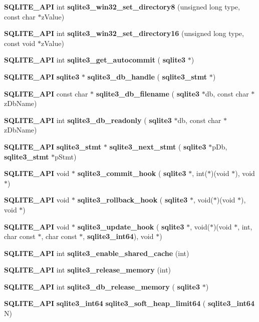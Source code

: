 \begin{DoxyCompactItemize}
\item 
\textbf{ S\+Q\+L\+I\+T\+E\+\_\+\+A\+PI} int \textbf{ sqlite3\+\_\+win32\+\_\+set\+\_\+directory8} (unsigned long type, const char $\ast$z\+Value)
\item 
\textbf{ S\+Q\+L\+I\+T\+E\+\_\+\+A\+PI} int \textbf{ sqlite3\+\_\+win32\+\_\+set\+\_\+directory16} (unsigned long type, const void $\ast$z\+Value)
\item 
\textbf{ S\+Q\+L\+I\+T\+E\+\_\+\+A\+PI} int \textbf{ sqlite3\+\_\+get\+\_\+autocommit} (\textbf{ sqlite3} $\ast$)
\item 
\textbf{ S\+Q\+L\+I\+T\+E\+\_\+\+A\+PI} \textbf{ sqlite3} $\ast$ \textbf{ sqlite3\+\_\+db\+\_\+handle} (\textbf{ sqlite3\+\_\+stmt} $\ast$)
\item 
\textbf{ S\+Q\+L\+I\+T\+E\+\_\+\+A\+PI} const char $\ast$ \textbf{ sqlite3\+\_\+db\+\_\+filename} (\textbf{ sqlite3} $\ast$db, const char $\ast$z\+Db\+Name)
\item 
\textbf{ S\+Q\+L\+I\+T\+E\+\_\+\+A\+PI} int \textbf{ sqlite3\+\_\+db\+\_\+readonly} (\textbf{ sqlite3} $\ast$db, const char $\ast$z\+Db\+Name)
\item 
\textbf{ S\+Q\+L\+I\+T\+E\+\_\+\+A\+PI} \textbf{ sqlite3\+\_\+stmt} $\ast$ \textbf{ sqlite3\+\_\+next\+\_\+stmt} (\textbf{ sqlite3} $\ast$p\+Db, \textbf{ sqlite3\+\_\+stmt} $\ast$p\+Stmt)
\item 
\textbf{ S\+Q\+L\+I\+T\+E\+\_\+\+A\+PI} void $\ast$ \textbf{ sqlite3\+\_\+commit\+\_\+hook} (\textbf{ sqlite3} $\ast$, int($\ast$)(void $\ast$), void $\ast$)
\item 
\textbf{ S\+Q\+L\+I\+T\+E\+\_\+\+A\+PI} void $\ast$ \textbf{ sqlite3\+\_\+rollback\+\_\+hook} (\textbf{ sqlite3} $\ast$, void($\ast$)(void $\ast$), void $\ast$)
\item 
\textbf{ S\+Q\+L\+I\+T\+E\+\_\+\+A\+PI} void $\ast$ \textbf{ sqlite3\+\_\+update\+\_\+hook} (\textbf{ sqlite3} $\ast$, void($\ast$)(void $\ast$, int, char const $\ast$, char const $\ast$, \textbf{ sqlite3\+\_\+int64}), void $\ast$)
\item 
\textbf{ S\+Q\+L\+I\+T\+E\+\_\+\+A\+PI} int \textbf{ sqlite3\+\_\+enable\+\_\+shared\+\_\+cache} (int)
\item 
\textbf{ S\+Q\+L\+I\+T\+E\+\_\+\+A\+PI} int \textbf{ sqlite3\+\_\+release\+\_\+memory} (int)
\item 
\textbf{ S\+Q\+L\+I\+T\+E\+\_\+\+A\+PI} int \textbf{ sqlite3\+\_\+db\+\_\+release\+\_\+memory} (\textbf{ sqlite3} $\ast$)
\item 
\textbf{ S\+Q\+L\+I\+T\+E\+\_\+\+A\+PI} \textbf{ sqlite3\+\_\+int64} \textbf{ sqlite3\+\_\+soft\+\_\+heap\+\_\+limit64} (\textbf{ sqlite3\+\_\+int64} N)

\end{DoxyCompactItemize}
